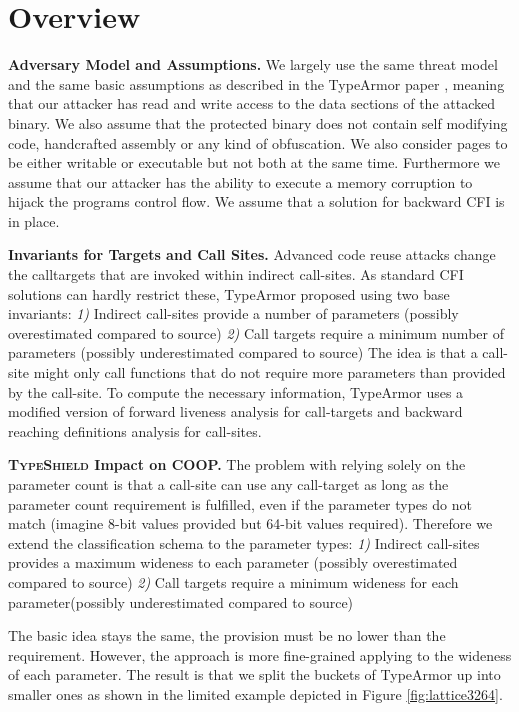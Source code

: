 \section{Overview}
\label{chapter:TypeShild Overview}

\textbf{Adversary Model and Assumptions.}
\label{Adversary Model}
We largely use the same threat model and the same basic assumptions as described in the TypeArmor 
paper \cite{veen:typearmor}, meaning that our attacker has read and write access to the data 
sections of the attacked binary.  We also assume that the protected binary does not contain 
self modifying code, handcrafted assembly or any kind of obfuscation. We also consider pages 
to be either writable or executable but not both at the same time. Furthermore we assume 
that our attacker has the ability to execute a memory corruption to hijack the programs 
control flow. We assume that a solution for backward CFI is in place.

\textbf{Invariants for Targets and Call Sites.}
\label{Invariants for Targets and Callsites}
Advanced code reuse attacks change the calltargets that are invoked within indirect 
call-sites. As standard CFI solutions can hardly restrict these, TypeArmor proposed using two base invariants:
\textit{1)} Indirect call-sites provide a number of parameters (possibly overestimated compared to source)
\textit{2)} Call targets require a minimum number of parameters (possibly underestimated compared to source)
The idea is that a call-site might only call functions that do not require more parameters than provided by the call-site. 
To compute the necessary information, TypeArmor uses a modified version of forward liveness analysis for call-targets and 
backward reaching definitions analysis for call-sites.

\textbf{\textsc{TypeShield} Impact on COOP.}
\label{TypeShild Impact on COOP}
The problem with relying solely on the parameter count is that a call-site can use any call-target as long as the parameter count 
requirement is fulfilled, even if the parameter types do not match (imagine 8-bit values provided but 64-bit values required). 
Therefore we extend the classification schema to the parameter types:
\textit{1)} Indirect call-sites provides a maximum wideness to each parameter (possibly overestimated compared to source)
\textit{2)} Call targets require a minimum wideness for each parameter(possibly underestimated compared to source)

The basic idea stays the same, the provision must be no lower than the requirement. However, the approach is more fine-grained 
applying to the wideness of each parameter. The result is that we split the buckets of TypeArmor up into smaller ones as shown 
in the limited example depicted in Figure \ref{fig:lattice3264}.
